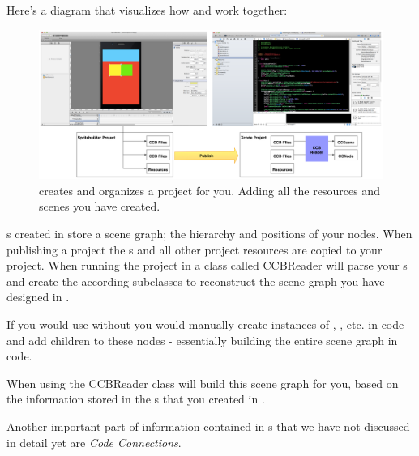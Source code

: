 Here's a diagram that visualizes how \SB{} and \xcode{} work together:
\begin{figure}[H]
		\centering
		\includegraphics[width=0.9\linewidth]{images/spritebuilder/spritebuilder_publishing.png}
		\caption{\SB{} creates and organizes a \xcode{} project for you. Adding
		all the resources and scenes you have created.}
\end{figure}
\ccbfile{}s created in \SB{} store a scene graph; the hierarchy and positions of
your nodes. When publishing a \SB{} project the \ccbfile{}s and all other
project resources are copied to your \xcode{} project.
\label{CCBReader}
When running the project in \xcode{} a class called CCBReader will parse your
\ccbfile{}s and create the according \ccnode{} subclasses to reconstruct the scene
graph you have designed in \SB{}.

If you would use \cocos{} without \SB{} you would manually create instances of
\ccnode{}, \ccsprite{}, etc. in code and add children to these nodes -
essentially building the entire scene graph in code.

When using \SB{} the CCBReader class will build this scene graph for you, based
on the information stored in the \ccbfile{}s that you created in \SB{}.

Another important part of information contained in \ccbfile{}s that we have not
discussed in detail yet are \textit{Code Connections}.


